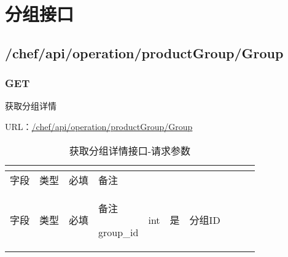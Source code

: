 \begin{lstlisting}[language=bash]

\end{lstlisting}






\begin{lstlisting}[language=bash]

\end{lstlisting}



\begin{lstlisting}[language=bash]

\end{lstlisting}







\chapter{分组接口}


\section{/chef/api/operation/productGroup/Group}


\subsection{GET}

获取分组详情

URL：\url{/chef/api/operation/productGroup/Group}





\begin{longtable}{|m{50pt}|m{40pt}|m{50pt}|m{50pt}|}
\tabularnewline\hline
字段&类型&必填&备注
\endhead

\caption{获取分组详情接口-请求参数}\\
\hline
字段&类型&必填&备注
\endfirsthead

\endfoot

\endlastfoot
\hline
group\_id&int&是&分组ID\\
\hline
\end{longtable}

